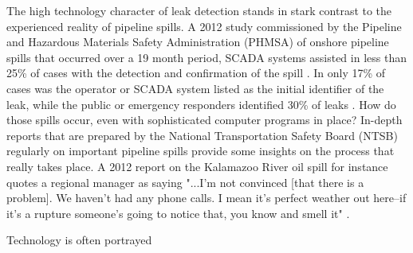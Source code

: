 \documentclass[12pt, man, natbib]{apa6}
\begin{document}
	The high technology character of leak detection stands in stark contrast to the experienced reality of pipeline spills. A 2012 study commissioned by the Pipeline and Hazardous Materials Safety Administration (PHMSA) of onshore pipeline spills that occurred over a 19 month period, SCADA systems assisted in less than 25\% of cases with the detection and confirmation of the spill \citep[p. 3-33]{Shaw2012}. In only 17\% of cases was the operator or SCADA system listed as the initial identifier of the leak, while the public or emergency responders identified 30\% of leaks \citep[p. 3-39]{Shaw2012}. How do those spills occur, even with sophisticated computer programs in place? In-depth reports that are prepared by the National Transportation Safety Board (NTSB) regularly on important pipeline spills provide some insights on the process that really takes place. A 2012 report on the Kalamazoo River oil spill for instance quotes a regional manager as saying "...I'm not convinced [that there is a problem]. We haven't had any phone calls. I mean it's perfect weather out here--if it's a rupture someone's going to notice that, you know and smell it" \citep[p. ]{NTSB2012}.
	
	Technology is often portrayed 
	
	
	
\end{document}
